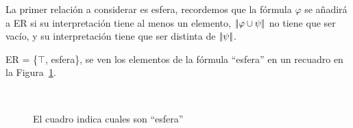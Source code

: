 %

La primer relaci\'on a considerar es \textsf{esfera}, recordemos que la f\'ormula $\varphi$ se a\~nadir\'a a ER si su interpretaci\'on tiene al menos un elemento, $|\!|\varphi \cup \psi|\!|$ no tiene que ser vac\'io, y su interpretaci\'on tiene que ser distinta de $|\!|\psi|\!|$. 

ER = \{$\top$, \textsf{esfera}\}, se ven los elementos de la f\'ormula ``esfera'' en un recuadro en la Figura~\ref{fig-modelo3}.

\begin{figure}[ht]
\begin{center}
\\[0pt]
\caption{El cuadro indica cuales son ``esfera''}
\label{fig-modelo3}
\end{center}
\end{figure}

